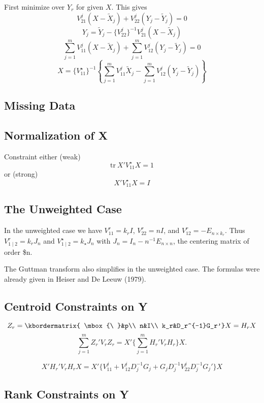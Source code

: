\documentclass[
  12pt,
]{article}
\begin{document}
First minimize over \(Y_r\) for given \(X\). This gives
\[
V_{21}^j(X-\tilde X_j)+V_{22}^j(Y_j-\tilde Y_j)=0
\]
\[
Y_j=\tilde Y_j-\{V_{22}^j\}^{-1}V_{21}^j(X-\tilde X_j)
\]
\[
\sum_{j=1}^m V_{11}^j(X-\tilde X_j)+\sum_{j=1}^mV_{12}^j(Y_j-\tilde Y_j) = 0
\]
\[
X = \{V_{11}^\star\}^{-1}\left\{\sum_{j=1}^m V_{11}^j\tilde X_j-\sum_{j=1}^m V_{12}^j(Y_j-\tilde Y_j)\right\}
\]

\subsection{Missing Data}\label{missing-data}

\subsection{Normalization of X}\label{normalization-of-x}

Constraint either (weak)
\[
\text{tr}\ X'V_{11}^\star X = 1
\]
or (strong)
\[
X'V_{11}^\star X = I
\]

\subsection{The Unweighted Case}\label{the-unweighted-case}

In the unweighted case we have \(V_{11}^r=k_rI\), \(V_{22}^r=nI\), and
\(V_{12}^r=-E_{n\times k_r}\). Thus
\(V_{1\mid2}^r=k_rJ_n\) and \(V_{1\mid 2}^\star=k_\star J_n\)
with \(J_n=I_n-n^{-1}E_{n\times n}\), the centering matrix of order \$n.

The Guttman transform also simplifies in the unweighted case. The formulas were already given in Heiser and De Leeuw (1979).

\subsection{Centroid Constraints on Y}\label{centroid-constraints-on-y}

\[
Z_r=
\kbordermatrix{
\mbox{\ }&p\\
n&I\\
k_r&D_r^{-1}G_r'}X=H_rX
\]
\[
\sum_{j=1}^m Z_r'V_rZ_r=X'\{\sum_{j=1}^mH_r'V_rH_r\}X.
\]

\[
X'H_r'V_rH_rX=X'\{V_{11}^j+V_{12}^jD_j^{-1}G_j+G_jD_j^{-1}V_{22}^jD_j^{-1}G_j'\}X
\]

\subsection{Rank Constraints on Y}\label{rank-constraints-on-y}
\end{document}
